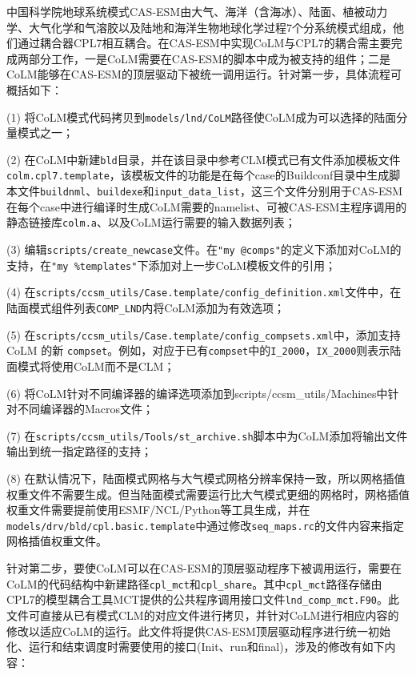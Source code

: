 中国科学院地球系统模式CAS-ESM由大气、海洋（含海冰）、陆面、植被动力学、大气化学和气溶胶以及陆地和海洋生物地球化学过程7个分系统模式组成，他们通过耦合器CPL7相互耦合。在CAS-ESM中实现CoLM与CPL7的耦合需主要完成两部分工作，一是CoLM需要在CAS-ESM的脚本中成为被支持的组件；二是CoLM能够在CAS-ESM的顶层驱动下被统一调用运行。针对第一步，具体流程可概括如下：

(1) 将CoLM模式代码拷贝到\texttt{models/lnd/CoLM}路径使CoLM成为可以选择的陆面分量模式之一；


(2) 在CoLM中新建\texttt{bld}目录，并在该目录中参考CLM模式已有文件添加模板文件\texttt{colm.cpl7.template}，该模板文件的功能是在每个case的Buildconf目录中生成脚本文件\texttt{buildnml}、\texttt{buildexe}和\texttt{input\_data\_list}，这三个文件分别用于CAS-ESM在每个case中进行编译时生成CoLM需要的namelist、可被CAS-ESM主程序调用的静态链接库\texttt{colm.a}、以及CoLM运行需要的输入数据列表；

(3) 编辑\texttt{scripts/create\_newcase}文件。在\texttt{"my @comps"}的定义下添加对CoLM的支持，在\texttt{"my \%templates"}下添加对上一步CoLM模板文件的引用；

(4) 在\texttt{scripts/ccsm\_utils/Case.template/config\_definition.xml}文件中，在陆面模式组件列表\texttt{COMP\_LND}内将CoLM添加为有效选项；

(5) 在\texttt{scripts/ccsm\_utils/Case.template/config\_compsets.xml}中，添加支持CoLM 的新 \texttt{compset}。例如，对应于已有\texttt{compset}中的\texttt{I\_2000}，\texttt{IX\_2000}则表示陆面模式将使用CoLM而不是CLM；

(6) 将CoLM针对不同编译器的编译选项添加到scripts/ccsm\_utils/Machines中针对不同编译器的Macros文件；

(7) 在\texttt{scripts/ccsm\_utils/Tools/st\_archive.sh}脚本中为CoLM添加将输出文件输出到统一指定路径的支持；

(8) 在默认情况下，陆面模式网格与大气模式网格分辨率保持一致，所以网格插值权重文件不需要生成。但当陆面模式需要运行比大气模式更细的网格时，网格插值权重文件需要提前使用ESMF/NCL/Python等工具生成，并在\texttt{models/drv/bld/cpl.basic.\allowbreak template}中通过修改\texttt{seq\_maps.rc}的文件内容来指定网格插值权重文件。

针对第二步，要使CoLM可以在CAS-ESM的顶层驱动程序下被调用运行，需要在CoLM的代码结构中新建路径\texttt{cpl\_mct}和\texttt{cpl\_share}。其中\texttt{cpl\_mct}路径存储由CPL7的模型耦合工具MCT提供的公共程序调用接口文件\texttt{lnd\_comp\_mct.F90}。此文件可直接从已有模式CLM的对应文件进行拷贝，并针对CoLM进行相应内容的修改以适应CoLM的运行。此文件将提供CAS-ESM顶层驱动程序进行统一初始化、运行和结束调度时需要使用的接口(Init、run和final)，涉及的修改有如下内容：

